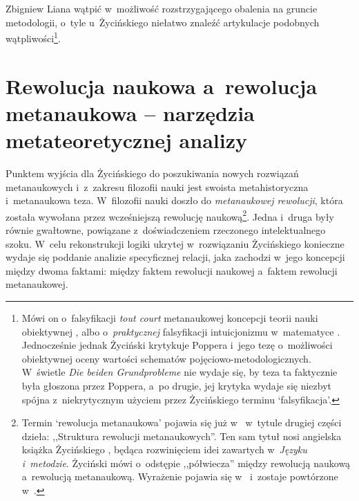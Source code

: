 \begin{artplenv}{Zbigniew Liana}
wątpić w~możliwość rozstrzygającego obalenia na gruncie metodologii, o~tyle u~Życińskiego niełatwo znaleźć artykulacje
podobnych wątpliwości\footnote{Mówi on o~falsyfikacji \textit{tout court} metanaukowej koncepcji teorii nauki
obiektywnej
\parencites[s.~9]{zycinski_structure_1988}[s.~17]{zycinski_struktura_2013},
albo o~\textit{praktycznej} falsyfikacji
intuicjonizmu w~matematyce
\parencites[s.~97]{zycinski_structure_1988}[s.~174]{zycinski_struktura_2013}.
Jednocześnie jednak Życiński
\parencites*[s.~140]{zycinski_structure_1988}[s.~248]{zycinski_struktura_2013}
krytykuje Poppera i~jego tezę o~możliwości obiektywnej
oceny wartości schematów pojęciowo-metodologicznych. W~świetle \textit{Die beiden Grundprobleme} nie wydaje się, by teza
ta faktycznie była głoszona przez Poppera, a~po drugie, jej krytyka wydaje się niezbyt spójna z~niekrytycznym użyciem
przez Życińskiego terminu `falsyfikacja'.}.

\section{Rewolucja naukowa a~rewolucja metanaukowa -- narzędzia metateoretycznej analizy}

Punktem wyjścia dla Życińskiego do poszukiwania nowych rozwiązań metanaukowych i~z~zakresu filozofii nauki jest swoista
metahistoryczna i~metanaukowa teza. W~filozofii nauki doszło do \textit{metanaukowej rewolucji}, która została wywołana
przez wcześniejszą rewolucję naukową\footnote{Termin `rewolucja metanaukowa' pojawia się już
w~\parencite[s.~99]{zycinski_jezyk_1983}
w~tytule drugiej części dzieła: ,,Struktura rewolucji
metanaukowych''. Ten sam tytuł nosi angielska książka Życińskiego
\parencite*{zycinski_structure_1988},
będąca rozwinięciem
idei zawartych w~\textit{Języku i~metodzie}. Życiński mówi o~odstępie ,,półwiecza'' między rewolucją naukową a~rewolucją
metanaukową. Wyrażenie pojawia się
w~\parencite[s.~101]{zycinski_jezyk_1983}
i~zostaje powtórzone w~\parencite[s.~126]{zycinski_elementy_1996}.
}.
Jedna i~druga były
równie gwałtowne, powiązane z~doświadczeniem rzeczonego intelektualnego szoku. W~celu rekonstrukcji logiki ukrytej w~rozwiązaniu
Życińskiego konieczne wydaje się poddanie analizie specyficznej relacji, jaka zachodzi w~jego koncepcji
między dwoma faktami: między faktem rewolucji naukowej a~faktem rewolucji metanaukowej.


\end{artplenv}
